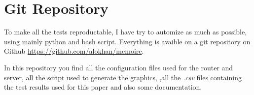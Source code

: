     \section{Git Repository}

    To make all the tests reproductable, I have try to automize as much as possible, using mainly python and bash script.
    Everything is avaible on a git repository on Github \url{https://github.com/alokhan/memoire}.

    In this repository you find all the configuration files used for the router and server, all the script used to generate the graphics,
    ,all the \textit{.csv} files containing the test results used for this paper and also some documentation.
